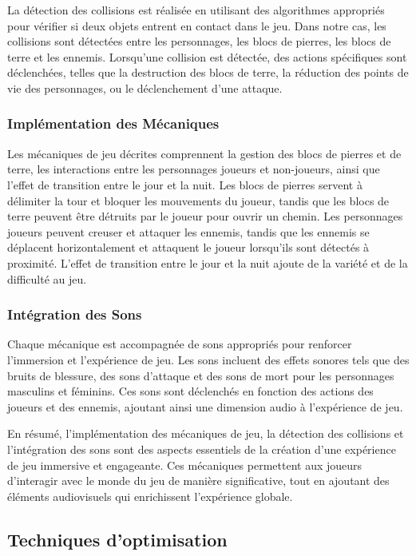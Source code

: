 \documentclass[a4paper,12pt]{article}
\begin{document}
La détection des collisions est réalisée en utilisant des algorithmes appropriés pour vérifier si deux objets entrent en contact dans le jeu. Dans notre cas, les collisions sont détectées entre les personnages, les blocs de pierres, les blocs de terre et les ennemis. Lorsqu'une collision est détectée, des actions spécifiques sont déclenchées, telles que la destruction des blocs de terre, la réduction des points de vie des personnages, ou le déclenchement d'une attaque.

\subsubsection{Implémentation des Mécaniques}

Les mécaniques de jeu décrites comprennent la gestion des blocs de pierres et de terre, les interactions entre les personnages joueurs et non-joueurs, ainsi que l'effet de transition entre le jour et la nuit. Les blocs de pierres servent à délimiter la tour et bloquer les mouvements du joueur, tandis que les blocs de terre peuvent être détruits par le joueur pour ouvrir un chemin. Les personnages joueurs peuvent creuser et attaquer les ennemis, tandis que les ennemis se déplacent horizontalement et attaquent le joueur lorsqu'ils sont détectés à proximité. L'effet de transition entre le jour et la nuit ajoute de la variété et de la difficulté au jeu.

\subsubsection{Intégration des Sons}

Chaque mécanique est accompagnée de sons appropriés pour renforcer l'immersion et l'expérience de jeu. Les sons incluent des effets sonores tels que des bruits de blessure, des sons d'attaque et des sons de mort pour les personnages masculins et féminins. Ces sons sont déclenchés en fonction des actions des joueurs et des ennemis, ajoutant ainsi une dimension audio à l'expérience de jeu.

En résumé, l'implémentation des mécaniques de jeu, la détection des collisions et l'intégration des sons sont des aspects essentiels de la création d'une expérience de jeu immersive et engageante. Ces mécaniques permettent aux joueurs d'interagir avec le monde du jeu de manière significative, tout en ajoutant des éléments audiovisuels qui enrichissent l'expérience globale.

\subsection{Techniques d'optimisation}
\end{document}
